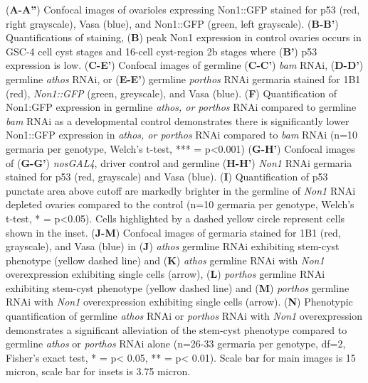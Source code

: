 \documentclass[12pt,oneside]{reedthesis}
\begin{document}
\setlength\parindent{0pt}(\textbf{A-A''}) Confocal images of ovarioles expressing Non1::GFP stained for p53 (red, right grayscale), Vasa (blue), and Non1::GFP (green, left grayscale). (\textbf{B-B'}) Quantifications of staining, (\textbf{B}) peak Non1 expression in control ovaries occurs in GSC-4 cell cyst stages and 16-cell cyst-region 2b stages where (\textbf{B'}) p53 expression is low. (\textbf{C-E'}) Confocal images of germline (\textbf{C-C'}) \emph{bam} RNAi, (\textbf{D-D'}) germline \emph{athos} RNAi, or (\textbf{E-E'}) germline \emph{porthos} RNAi germaria stained for 1B1 (red), \emph{Non1::GFP} (green, greyscale), and Vasa (blue). (\textbf{F}) Quantification of Non1:GFP expression in germline \emph{athos, or porthos} RNAi compared to germline \emph{bam} RNAi as a developmental control demonstrates there is significantly lower Non1::GFP expression in \emph{athos, or porthos} RNAi compared to \emph{bam} RNAi (n=10 germaria per genotype, Welch's t-test, *** = p\textless0.001) (\textbf{G-H'}) Confocal images of (\textbf{G-G'}) \emph{nosGAL4}, driver control and germline (\textbf{H-H'}) \emph{Non1} RNAi germaria stained for p53 (red, grayscale) and Vasa (blue). (\textbf{I}) Quantification of p53 punctate area above cutoff are markedly brighter in the germline of \emph{Non1} RNAi depleted ovaries compared to the control (n=10 germaria per genotype, Welch's t-test, * = p\textless0.05). Cells highlighted by a dashed yellow circle represent cells shown in the inset. (\textbf{J-M}) Confocal images of germaria stained for 1B1 (red, grayscale), and Vasa (blue) in (\textbf{J}) \emph{athos} germline RNAi exhibiting stem-cyst phenotype (yellow dashed line) and (\textbf{K}) \emph{athos} germline RNAi with \emph{Non1} overexpression exhibiting single cells (arrow), (\textbf{L}) \emph{porthos} germline RNAi exhibiting stem-cyst phenotype (yellow dashed line) and (\textbf{M}) \emph{porthos} germline RNAi with \emph{Non1} overexpression exhibiting single cells (arrow). (\textbf{N}) Phenotypic quantification of germline \emph{athos} RNAi or \emph{porthos} RNAi with \emph{Non1} overexpression demonstrates a significant alleviation of the stem-cyst phenotype compared to germline \emph{athos} or \emph{porthos} RNAi alone (n=26-33 germaria per genotype, df=2, Fisher's exact test, * = p\textless{} 0.05, ** = p\textless{} 0.01). Scale bar for main images is 15 micron, scale bar for insets is 3.75 micron.


\textbf{\\
}
\end{document}
